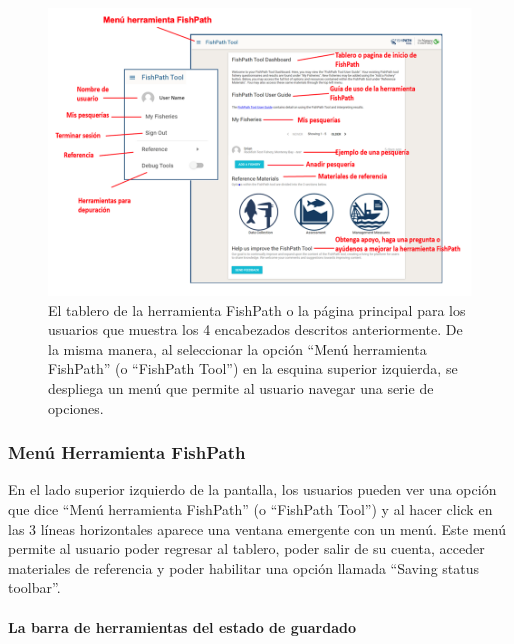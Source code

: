\documentclass[
  11pt,
]{book}
\begin{document}
\begin{figure}

{\centering \includegraphics[width=0.95\linewidth]{images/user-dashboard-es} 

}

\caption{El tablero de la herramienta FishPath o la página principal para los usuarios que muestra los 4 encabezados descritos anteriormente. De la misma manera, al seleccionar la opción “Menú herramienta FishPath” (o “FishPath Tool”) en la esquina superior izquierda, se despliega un menú que permite al usuario navegar una serie de opciones.}\label{fig:dashboard}
\end{figure}

\hypertarget{menuxfa-herramienta-fishpath}{%
\subsubsection{Menú Herramienta FishPath}\label{menuxfa-herramienta-fishpath}}

En el lado superior izquierdo de la pantalla, los usuarios pueden ver una opción que dice ``Menú herramienta FishPath'' (o ``FishPath Tool'') y al hacer click en las 3 líneas horizontales aparece una ventana emergente con un menú. Este menú permite al usuario poder regresar al tablero, poder salir de su cuenta, acceder materiales de referencia y poder habilitar una opción llamada ``Saving status toolbar''.

\hypertarget{la-barra-de-herramientas-del-estado-de-guardado}{%
\paragraph{La barra de herramientas del estado de guardado}\label{la-barra-de-herramientas-del-estado-de-guardado}}
\end{document}
